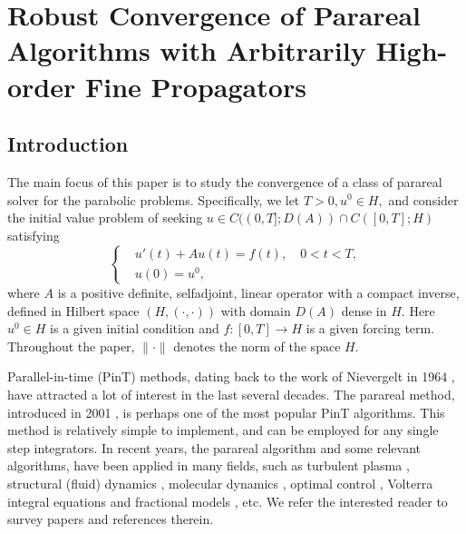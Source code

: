 
\chapter[Rubust Parareal]{Robust Convergence of Parareal Algorithms with Arbitrarily High-order Fine Propagators}




\section{Introduction}\label{sec:intro}
The main focus of this paper is to study the convergence of a class of parareal solver for the parabolic problems. Specifically,
we let $T >0, u^0\in H,$ and consider the initial value
problem of seeking $u \in C((0,T];D(A))\cap C([0,T];H)$ satisfying
%
\begin{equation}\label{eqn:pde}
\left \{
\begin{aligned}
&u' (t) + Au(t) = f(t), \quad 0<t<T,\\
& u(0)=u^0 ,
\end{aligned}
\right .
\end{equation}
%
where $A$ is a positive definite, selfadjoint, linear operator with a compact inverse, defined in
Hilbert space $(H, (\cdot , \cdot )) $ with domain $D(A)$ dense in $H$.
Here $u^0 \in H$ is a given initial condition
and $f  : [0,T] \to H$ is a given forcing term.
Throughout the paper, $\| \cdot \|$ denotes the norm of the space $H$.

Parallel-in-time (PinT) methods, dating back to the work of Nievergelt in
1964 \cite{Nievergelt:1964}, have attracted a lot of interest in the last several decades.
The parareal method, introduced in 2001 \cite{LionsMadayTurinici:2001}, is perhaps one of the most popular PinT algorithms.
This method is relatively simple to implement, and can be employed for any single step integrators.
In recent years, the parareal algorithm and some relevant algorithms, have been applied in many fields,
such as turbulent plasma \cite{Reynolds-Barredo:2012, Reynolds-Barredo:2013},
structural (fluid) dynamics \cite{CortialFarhat:2009, Farhat:2003},
molecular dynamics \cite{Baffico:2002}, optimal control \cite{MadaySalomonTurinici:2007, MathewSarkisSchaerer:2010},
Volterra integral equations and fractional models \cite{LiTangXu:2013, WuZhou:2017frac}, etc.
We refer the interested reader to
survey papers \cite{Gander:2015, OngSchroder:2020} and references
therein.


